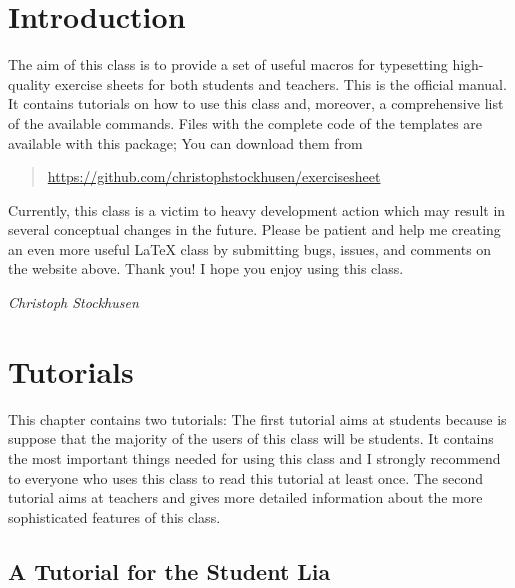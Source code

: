 \documentclass[a4paper,fleqn]{report}
\let\sffamily=\rmfamily
\def\exercisesheet{{exercisesheet}}
\begin{document}



\chapter*{Introduction}

The aim of this class is to provide a set of useful macros for
typesetting high-quality exercise sheets for both students and
teachers. This is the official manual. It contains tutorials on how to
use this class and, moreover, a comprehensive list of the available
commands. Files with the complete code of the templates are available
with this package; You can download them from 
\begin{quote}
  \url{https://github.com/christophstockhusen/exercisesheet} 
\end{quote}
Currently, this class is a victim to heavy development action which
may result in several conceptual changes in the future. Please be
patient and help me creating an even more useful \LaTeX{} class by
submitting bugs, issues, and comments on the website above. Thank you!
I hope you enjoy using this class.

\medskip\hfill{\itshape Christoph Stockhusen}


\tableofcontents


\chapter{Tutorials}

This chapter contains two tutorials: The first tutorial aims at
students because is suppose that the majority of the users of this
class will be students. It contains the most important things needed
for using this class and I strongly recommend to everyone who uses
this class to read this tutorial at least once. The second tutorial
aims at teachers and gives more detailed information about the more
sophisticated features of this class.


\section{A Tutorial for the Student Lia}
\end{document}
